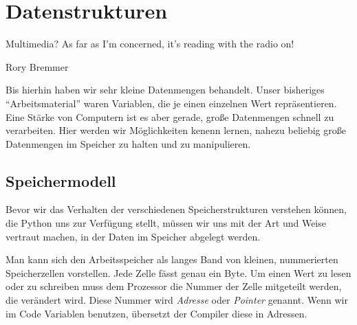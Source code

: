 \chapter{Datenstrukturen}
\label{chp:Containers}
\epigraph{
	Multimedia? As far as I'm concerned, it's reading with the radio on!
}{Rory Bremmer}

Bis hierhin haben wir sehr kleine Datenmengen behandelt. Unser bisheriges \enquote{Arbeitsmaterial} waren
Variablen, die je einen einzelnen Wert repräsentieren. Eine Stärke von Computern ist es aber gerade, große
Datenmengen schnell zu verarbeiten. Hier werden wir Möglichkeiten kenenn lernen, nahezu beliebig
große Datenmengen im Speicher zu halten und zu manipulieren.

\section{Speichermodell}
Bevor wir das Verhalten der verschiedenen Speicherstrukturen verstehen können, die Python uns zur Verfügung stellt, müssen wir uns mit der Art und Weise vertraut machen, in der Daten im Speicher abgelegt werden.

Man kann sich den Arbeitsspeicher als langes Band von kleinen, nummerierten Speicherzellen vorstellen. Jede Zelle fässt genau ein Byte. Um einen Wert zu lesen oder zu schreiben muss dem Prozessor die Nummer der Zelle mitgeteilt werden, die verändert wird. Diese Nummer wird \emph{Adresse} oder \emph{Pointer} genannt. Wenn wir im Code Variablen benutzen, übersetzt der Compiler diese in Adressen. 

